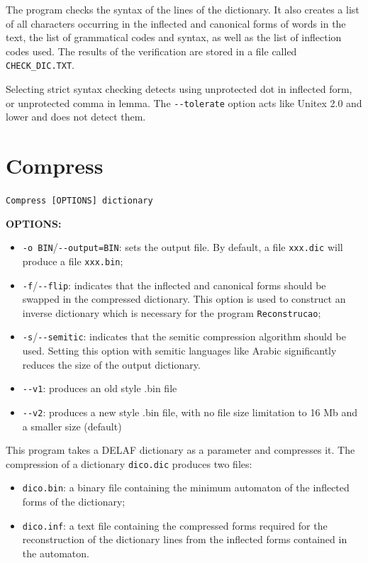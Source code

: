 \bigskip
\noindent The program checks the syntax of the lines of the dictionary. It also creates a
list of all characters occurring in the inflected and canonical forms of words in
the text, the list of grammatical codes and syntax, as well as the list of
inflection codes used. The results of the verification are stored in a file
called \verb+CHECK_DIC.TXT+.

\bigskip
\noindent Selecting strict syntax checking detects using unprotected dot in
inflected form, or unprotected comma in lemma. The \verb+--tolerate+ option acts like Unitex 2.0
and lower and does not detect them.





\section{Compress}
\label{section-compress}
\verb+Compress [OPTIONS] dictionary+

\bigskip
\noindent \textbf{OPTIONS:}
\begin{itemize}
  \item \verb+-o BIN+/\verb+--output=BIN+: sets the output file. By default, a file \verb+xxx.dic+ will
  produce a file \verb+xxx.bin+;
  \item \verb+-f+/\verb+--flip+: indicates
  that the inflected and canonical forms should be swapped in the compressed
  dictionary. This option is used to construct an inverse dictionary which is
  necessary for the program \verb+Reconstrucao+;
  \item \verb+-s+/\verb+--semitic+: indicates that the semitic compression algorithm should be used. Setting
  this option with semitic languages like Arabic significantly reduces the size of the output dictionary.
  \item \verb+--v1+: produces an old style .bin file
  \item \verb+--v2+: produces a new style .bin file, with no file size limitation to 16 Mb and 
  a smaller size (default)
\end{itemize}

\bigskip
\noindent This program takes a DELAF dictionary as a parameter and compresses it.
The compression of a dictionary \verb+dico.dic+ produces two files:
\begin{itemize}
  \item \verb+dico.bin+: a binary file containing the minimum automaton of the inflected forms of the dictionary;
  \item \verb+dico.inf+: a text file containing the compressed forms required for the reconstruction of the dictionary
  lines from the inflected forms contained in the automaton.
\end{itemize}

